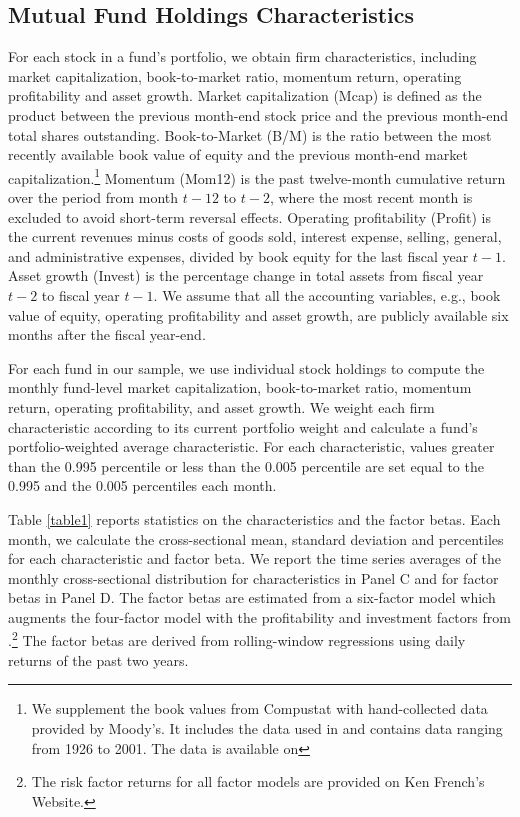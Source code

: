 \subsection{Mutual Fund Holdings Characteristics}
 For each stock in a fund's portfolio, we obtain firm characteristics, including market capitalization, book-to-market ratio, momentum return, operating profitability and asset growth. Market capitalization (Mcap) is defined as the product between the previous month-end stock price and the previous month-end  total shares outstanding. Book-to-Market (B/M) is the ratio between the most recently available book value of equity and the previous month-end market capitalization.\footnote{We supplement the book values from Compustat with hand-collected data provided by Moody's. It includes the data used in \citet{davis2000characteristics} and contains data ranging from 1926 to 2001. The data is available on } Momentum (Mom12) is the past twelve-month cumulative return over the period from month $t-12$ to $t-2$, where the most recent month is excluded to avoid short-term reversal effects. Operating profitability (Profit) is the current revenues minus costs of goods sold, interest expense, selling, general, and administrative expenses, divided by book equity for the last fiscal year $t-1$. Asset growth (Invest) is the percentage change in total assets from fiscal year $t-2$ to fiscal year $t-1$. We assume that all the accounting variables, e.g., book value of equity, operating profitability and asset growth, are publicly available six months after the fiscal year-end. 
 
 For each fund in our sample, we use individual stock holdings to compute the monthly fund-level market capitalization, book-to-market ratio, momentum return, operating profitability, and asset growth. We weight each firm characteristic according to its current portfolio weight and calculate a fund's portfolio-weighted average characteristic. For each characteristic, values greater than the 0.995 percentile or less than the 0.005 percentile are set equal to the 0.995 and the 0.005 percentiles each month. 
 
Table \ref{table1} reports statistics on the characteristics and the factor betas. Each month, we calculate the cross-sectional mean, standard deviation and percentiles for each characteristic and factor beta. We report the time series averages of the monthly cross-sectional distribution for characteristics in Panel C and for factor betas in Panel D. The factor betas are estimated from a six-factor model which augments the \citet{carhart1997persistence} four-factor model with the profitability and investment factors from \citet{FAMA20151}.\footnote{The risk factor returns for all factor models are provided on Ken French's Website.} The factor betas are derived from rolling-window regressions using daily returns of the past two years.
 
